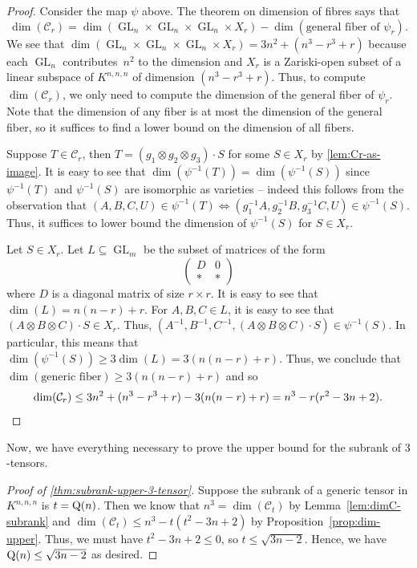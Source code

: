 \documentclass[11pt]{article}
\theoremstyle{definition}
\theoremstyle{remark}
\newcommand{\gensubrank}{{\rm Q}}
\newcommand{\GL}{\operatorname{GL}}
\begin{document}
\begin{proof} %
Consider the map $\psi$ above. The theorem on dimension of fibres says that 
$$
\dim(\mathcal{C}_r) = \dim(\GL_n \times \GL_n \times \GL_n \times X_r) - \dim(\text{general fiber of } \psi_r).
$$
We see that $\dim(\GL_n \times \GL_n \times \GL_n \times X_r) = 3n^2 + (n^3-r^3 + r)$ because each $\GL_n$ contributes~$n^2$ to the dimension and $X_r$ is a Zariski-open subset of a linear subspace of $K^{n,n,n}$ of dimension $(n^3-r^3 + r)$. Thus, to compute $\dim(\mathcal{C}_r)$, we only need to compute the dimension of the general fiber of $\psi_r$. Note that the dimension of any fiber is at most the dimension of the general fiber, so it suffices to find a lower bound on the dimension of all fibers.

Suppose $T \in \mathcal{C}_r$, then $T = (g_1 \otimes g_2 \otimes g_3) \cdot S$ for some $S \in X_r$ by \autoref{lem:Cr-as-image}. It is easy to see that $\dim(\psi^{-1}(T)) = \dim(\psi^{-1}(S))$ since $\psi^{-1}(T)$ and $\psi^{-1}(S)$ are isomorphic as varieties -- indeed this follows from the observation that $(A,B,C,U) \in \psi^{-1}(T) \Longleftrightarrow (g_1^{-1}A, g_2^{-1}B, g_3^{-1}C, U) \in \psi^{-1}(S)$. Thus, it suffices to lower bound the dimension of $\psi^{-1}(S)$ for $S \in X_r$.

Let $S \in X_r$.
Let $L \subseteq \GL_m$ be the subset of matrices of the form 
\[
\begin{pmatrix} D & 0 \\ \ast & \ast \end{pmatrix}
\]
where $D$ is a diagonal matrix of size $r \times r$. It is easy to see that $\dim(L) = n(n-r) + r$. For $A,B,C \in L$, it is easy to see that $(A \otimes B \otimes C) \cdot S \in X_r$. Thus, $(A^{-1}, B^{-1}, C^{-1}, (A \otimes B \otimes C) \cdot S) \in \psi^{-1}(S)$. In particular, this means that $\dim(\psi^{-1}(S)) \geq 3 \dim(L) = 3(n(n-r) + r)$. Thus, we conclude that $\dim(\text{generic fiber}) \geq 3(n(n-r) + r)$ and so
\[
\dim(\mathcal{C}_r) \leq 3n^2 + (n^3-r^3 + r) - 3(n(n-r) + r) = n^3 - r(r^2-3n+2).\qedhere
\]

\end{proof}

Now, we have everything necessary to prove the upper bound for the subrank of $3$-tensors.
\begin{proof} [Proof of \autoref{thm:subrank-upper-3-tensor}]
Suppose the subrank of a generic tensor in $K^{n,n,n}$ is $t = \gensubrank(n)$. Then we know that $n^3 = \dim(\mathcal{C}_t)$ by Lemma~\ref{lem:dimC-subrank} and $\dim(\mathcal{C}_t) \leq n^3 - t(t^2 - 3n+2)$ by  Proposition~\ref{prop:dim-upper}. Thus, we must have $t^2 - 3n + 2 \leq 0$, so $t \leq \sqrt{3n-2}$. Hence, we have $\gensubrank(n) \leq \sqrt{3n-2}$ as desired. 
\end{proof}
\end{document}

